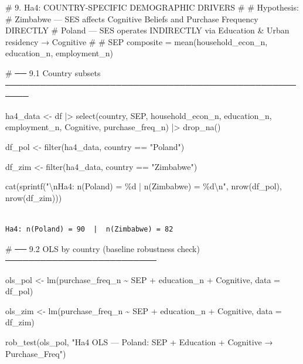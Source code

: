 \documentclass[
  letterpaper,
  DIV=11,
  numbers=noendperiod]{scrartcl}
\newenvironment{Shaded}{\begin{snugshade}}{\end{snugshade}}
\newcommand{\AttributeTok}[1]{\textcolor[rgb]{0.40,0.45,0.13}{#1}}
\newcommand{\CommentTok}[1]{\textcolor[rgb]{0.37,0.37,0.37}{#1}}
\newcommand{\FunctionTok}[1]{\textcolor[rgb]{0.28,0.35,0.67}{#1}}
\newcommand{\NormalTok}[1]{\textcolor[rgb]{0.00,0.23,0.31}{#1}}
\newcommand{\OtherTok}[1]{\textcolor[rgb]{0.00,0.23,0.31}{#1}}
\newcommand{\SpecialCharTok}[1]{\textcolor[rgb]{0.37,0.37,0.37}{#1}}
\newcommand{\StringTok}[1]{\textcolor[rgb]{0.13,0.47,0.30}{#1}}
\begin{document}
\begin{Shaded}
\begin{Highlighting}[]
\CommentTok{\# 9.  Ha4: COUNTRY{-}SPECIFIC DEMOGRAPHIC DRIVERS}
\CommentTok{\#}
\CommentTok{\#  Hypothesis:}
\CommentTok{\#    Zimbabwe — SES affects Cognitive Beliefs and Purchase Frequency DIRECTLY}
\CommentTok{\#    Poland   — SES operates INDIRECTLY via Education \& Urban residency → Cognitive}
\CommentTok{\#}
\CommentTok{\#  SEP composite = mean(household\_econ\_n, education\_n, employment\_n)}


\CommentTok{\# ── 9.1  Country subsets ──────────────────────────────────────────────────────}

\NormalTok{ha4\_data }\OtherTok{\textless{}{-}}\NormalTok{ df }\SpecialCharTok{|\textgreater{}}
  \FunctionTok{select}\NormalTok{(country, SEP, household\_econ\_n, education\_n, employment\_n,}
\NormalTok{         Cognitive, purchase\_freq\_n) }\SpecialCharTok{|\textgreater{}}
   \FunctionTok{drop\_na}\NormalTok{()}


\NormalTok{df\_pol }\OtherTok{\textless{}{-}} \FunctionTok{filter}\NormalTok{(ha4\_data, country }\SpecialCharTok{==} \StringTok{"Poland"}\NormalTok{)}

\NormalTok{df\_zim }\OtherTok{\textless{}{-}} \FunctionTok{filter}\NormalTok{(ha4\_data, country }\SpecialCharTok{==} \StringTok{"Zimbabwe"}\NormalTok{)}

\FunctionTok{cat}\NormalTok{(}\FunctionTok{sprintf}\NormalTok{(}\StringTok{"}\SpecialCharTok{\textbackslash{}n}\StringTok{Ha4: n(Poland) = \%d  |  n(Zimbabwe) = \%d}\SpecialCharTok{\textbackslash{}n}\StringTok{"}\NormalTok{,}
            \FunctionTok{nrow}\NormalTok{(df\_pol), }\FunctionTok{nrow}\NormalTok{(df\_zim)))}
\end{Highlighting}
\end{Shaded}

\begin{verbatim}

Ha4: n(Poland) = 90  |  n(Zimbabwe) = 82
\end{verbatim}

\begin{Shaded}
\begin{Highlighting}[]
\CommentTok{\# ── 9.2  OLS by country (baseline robustness check) ──────────────────────────}

\NormalTok{ols\_pol }\OtherTok{\textless{}{-}} \FunctionTok{lm}\NormalTok{(purchase\_freq\_n }\SpecialCharTok{\textasciitilde{}}\NormalTok{ SEP }\SpecialCharTok{+}\NormalTok{ education\_n }\SpecialCharTok{+}\NormalTok{ Cognitive, }\AttributeTok{data =}\NormalTok{ df\_pol)}

\NormalTok{ols\_zim }\OtherTok{\textless{}{-}} \FunctionTok{lm}\NormalTok{(purchase\_freq\_n }\SpecialCharTok{\textasciitilde{}}\NormalTok{ SEP }\SpecialCharTok{+}\NormalTok{ education\_n }\SpecialCharTok{+}\NormalTok{ Cognitive, }\AttributeTok{data =}\NormalTok{ df\_zim)}

\FunctionTok{rob\_test}\NormalTok{(ols\_pol, }
         \StringTok{"Ha4 OLS — Poland: SEP + Education + Cognitive → Purchase\_Freq"}\NormalTok{)}
\end{Highlighting}
\end{Shaded}
\end{document}
